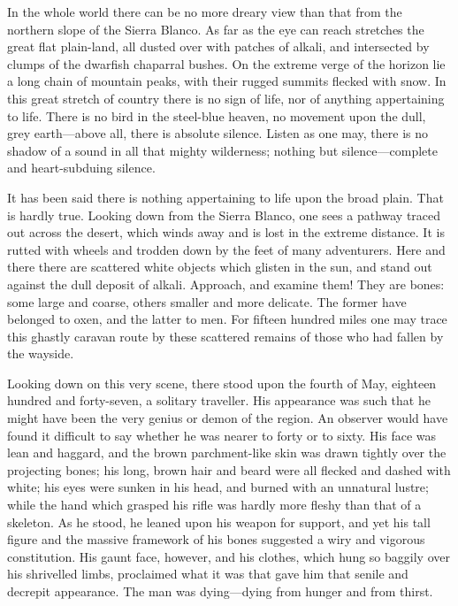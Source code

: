 \documentclass[12pt,english,oneside]{book}
\newcommand{\mdsh}[1]{\mbox{#1}\linebreak[1]}
\begin{document}
In the whole world there can be no more dreary view than that from
the northern slope of the Sierra Blanco. As far as the eye can reach
stretches the great flat plain-land, all dusted over with patches
of alkali, and intersected by clumps of the dwarfish chaparral bushes.
On the extreme verge of the horizon lie a long chain of mountain peaks,
with their rugged summits flecked with snow. In this great stretch
of country there is no sign of life, nor of anything appertaining
to life. There is no bird in the steel-blue heaven, no movement upon
the dull, grey earth\mdsh{---}above all, there is absolute silence.
Listen as one may, there is no shadow of a sound in all that mighty
wilderness; nothing but silence\mdsh{---}complete and heart-subduing
silence.

It has been said there is nothing appertaining to life upon the broad
plain. That is hardly true. Looking down from the Sierra Blanco, one
sees a pathway traced out across the desert, which winds away and
is lost in the extreme distance. It is rutted with wheels and trodden
down by the feet of many adventurers. Here and there there are scattered
white objects which glisten in the sun, and stand out against the
dull deposit of alkali. Approach, and examine them! They are bones:
some large and coarse, others smaller and more delicate. The former
have belonged to oxen, and the latter to men. For fifteen hundred
miles one may trace this ghastly caravan route by these scattered
remains of those who had fallen by the wayside.

Looking down on this very scene, there stood upon the fourth of May,
eighteen hundred and forty-seven, a solitary traveller. His appearance
was such that he might have been the very genius or demon of the region.
An observer would have found it difficult to say whether he was nearer
to forty or to sixty. His face was lean and haggard, and the brown
parchment-like skin was drawn tightly over the projecting bones; his
long, brown hair and beard were all flecked and dashed with white;
his eyes were sunken in his head, and burned with an unnatural lustre;
while the hand which grasped his rifle was hardly more fleshy than
that of a skeleton. As he stood, he leaned upon his weapon for support,
and yet his tall figure and the massive framework of his bones suggested
a wiry and vigorous constitution. His gaunt face, however, and his
clothes, which hung so baggily over his shrivelled limbs, proclaimed
what it was that gave him that senile and decrepit appearance. The
man was dying\mdsh{---}dying from hunger and from thirst.
\end{document}

